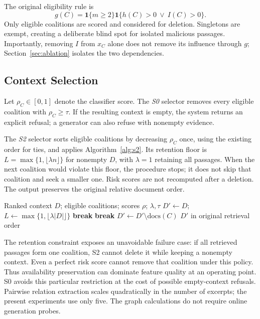 \documentclass[sigconf]{aamas}
\begin{document}
The original eligibility rule is
\begin{equation}
g(C)=\mathbf{1}\{m\geq2\}\mathbf{1}\{h(C)>0\ \lor\ I(C)>0\}.
\label{eq:gate}
\end{equation}
Only eligible coalitions are scored and considered for deletion. Singletons are exempt, creating a deliberate blind spot for isolated malicious passages. Importantly, removing $I$ from $x_C$ alone does not remove its influence through $g$; Section~\ref{sec:ablation} isolates the two dependencies.

\subsection{Context Selection}
Let $\rho_C\in[0,1]$ denote the classifier score. The \emph{S0} selector removes every eligible coalition with $\rho_C\geq\tau$. If the resulting context is empty, the system returns an explicit refusal; a generator can also refuse with nonempty evidence.

The \emph{S2} selector sorts eligible coalitions by decreasing $\rho_C$ once, using the existing order for ties, and applies Algorithm~\ref{alg:s2}. Its retention floor is $L=\max\{1,\lfloor\lambda n\rfloor\}$ for nonempty $D$, with $\lambda=1$ retaining all passages. When the next coalition would violate this floor, the procedure stops; it does not skip that coalition and seek a smaller one. Risk scores are not recomputed after a deletion. The output preserves the original relative document order.

\begin{algorithm}[t]
\caption{S2: coalition removal with a retention floor}
\label{alg:s2}
\begin{algorithmic}[1]
\Require Ranked context $D$; eligible coalitions; scores $\rho$; $\lambda,\tau$
\State $D'\gets D$; $L\gets\max\{1,\lfloor\lambda|D|\rfloor\}$
    \State \textbf{break}
  \EndIf
    \State \textbf{break}
  \EndIf
  \State $D'\gets D'\setminus\mathrm{docs}(C)$
\EndFor
\State \Return $D'$ in original retrieval order
\end{algorithmic}
\end{algorithm}

The retention constraint exposes an unavoidable failure case: if all retrieved passages form one coalition, S2 cannot delete it while keeping a nonempty context. Even a perfect risk score cannot remove that coalition under this policy. Thus availability preservation can dominate feature quality at an operating point. S0 avoids this particular restriction at the cost of possible empty-context refusals. Pairwise relation extraction scales quadratically in the number of excerpts; the present experiments use only five. The graph calculations do not require online generation probes.
\end{document}
